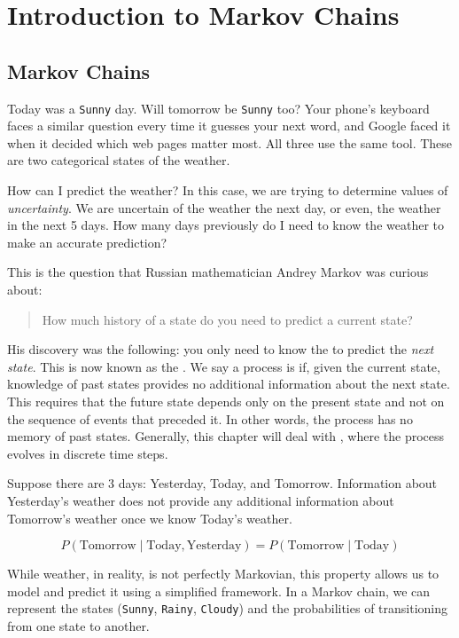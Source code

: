 \chapter{Introduction to Markov Chains}
\section{Markov Chains}
Today was a \texttt{Sunny} day. Will tomorrow be \texttt{Sunny} too? Your phone's keyboard faces a similar question every time it guesses your next word, and Google faced it when it decided which web pages matter most. All three use the same tool. These are two categorical states of the weather.

How can I predict the weather? In this case, we are trying to determine values of \emph{uncertainty}. We are uncertain of the weather the next day, or even, the weather in the next 5 days. How many days previously do I need to know the weather to make an accurate prediction?

This is the question that Russian mathematician Andrey Markov was curious about:
\begin{quote}
    How much history of a state do you need to predict a current state?
\end{quote}

His discovery was the following: you only need to know the  to predict the \textit{next state}. This is now known as the . We say a process is  if, given the current state, knowledge of past states provides no additional information about the next state. This requires that the future state depends only on the present state and not on the sequence of events that preceded it. In other words, the process has no memory of past states. Generally, this chapter will deal with , where the process evolves in discrete time steps. 

Suppose there are 3 days: Yesterday, Today, and Tomorrow. Information about Yesterday's weather does not provide any additional information about Tomorrow's weather once we know Today's weather.

$$
    P(\text{Tomorrow} \mid \text{Today}, \text{Yesterday})
    =
    P(\text{Tomorrow} \mid \text{Today})
$$

While weather, in reality, is not perfectly Markovian, this property allows us to model and predict it using a simplified framework. In a Markov chain, we can represent the states (\texttt{Sunny}, \texttt{Rainy}, \texttt{Cloudy}) and the probabilities of transitioning from one state to another.

